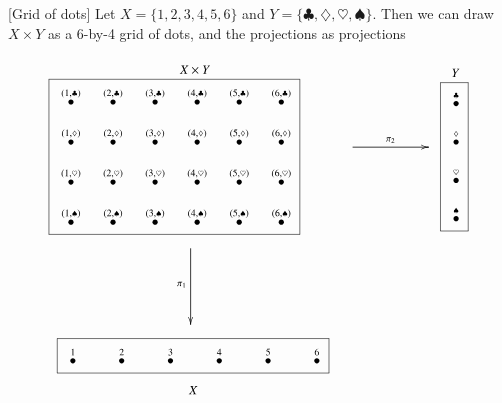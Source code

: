 \documentclass[a4paper]{book}
\newcommand{\LMO}[1]{\stackrel{#1}{\bullet}}
\theoremstyle{myth}
\newtheorem{exampleENG}[envENG]{\begin{english}Example\end{english}}
\begin{document}
\begin{english}
\begin{exampleENG}\label{ex:grid1}[Grid of dots]
Let $X=\{1,2,3,4,5,6\}$ and $Y=\{\clubsuit,\diamondsuit,\heartsuit,\spadesuit\}$. Then we can draw $X\times Y$ as a 6-by-4 grid of dots, and the projections as projections
\begin{align}
\parbox{2.9in}{\begin{center}\small $X\times Y$\vspace{-.1in}\end{center}\fbox{
\xymatrix@=10pt{
\LMO{(1,\clubsuit)}&\LMO{(2,\clubsuit)}&\LMO{(3,\clubsuit)}&\LMO{(4,\clubsuit)}&\LMO{(5,\clubsuit)}&\LMO{(6,\clubsuit)}\\
\LMO{(1,\diamondsuit)}&\LMO{(2,\diamondsuit)}&\LMO{(3,\diamondsuit)}&\LMO{(4,\diamondsuit)}&\LMO{(5,\diamondsuit)}&\LMO{(6,\diamondsuit)}\\
\LMO{(1,\heartsuit)}&\LMO{(2,\heartsuit)}&\LMO{(3,\heartsuit)}&\LMO{(4,\heartsuit)}&\LMO{(5,\heartsuit)}&\LMO{(6,\heartsuit)}\\
\LMO{(1,\spadesuit)}&\LMO{(2,\spadesuit)}&\LMO{(3,\spadesuit)}&\LMO{(4,\spadesuit)}&\LMO{(5,\spadesuit)}&\LMO{(6,\spadesuit)}\\
}}}
\parbox{.9in}{
\xymatrix{~\ar[rr]^{\pi_2}&&~}
}
\parbox{.3in}{\begin{center}\small $Y$\vspace{-.1in}\end{center}\fbox{
\xymatrix@=10pt{
\LMO{\clubsuit}\\\LMO{\diamondsuit}\\\LMO{\heartsuit}\\\LMO{\spadesuit}
}}}
\\\nonumber
\parbox{1in}{\hspace{-1.95in}\xymatrix{~\ar[dd]_{\pi_1}\\\\~}}
\\\nonumber
\parbox{2.9in}{\hspace{-1.2in}\fbox{
\xymatrix@=24pt{
\LMO{1}&\LMO{2}&\LMO{3}&\LMO{4}&\LMO{5}&\LMO{6}
}}\begin{center}\hspace{-2.6in}\small$X$\end{center}}
\end{align}
\end{exampleENG}


\end{english}
\end{document}
